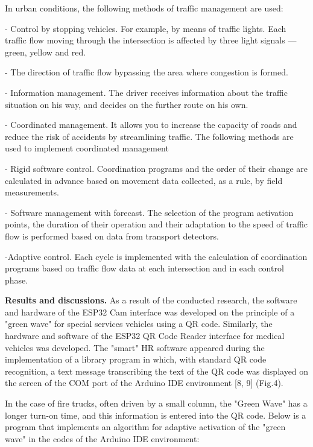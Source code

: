 \begin{multicols}{2}
In urban conditions, the following methods of traffic management are
used:

- Control by stopping vehicles. For example, by means of traffic lights.
Each traffic flow moving through the intersection is affected by three
light signals --- green, yellow and red.

- The direction of traffic flow bypassing the area where congestion is
formed.

- Information management. The driver receives information about the
traffic situation on his way, and decides on the further route on his
own.

- Coordinated management. It allows you to increase the capacity of
roads and reduce the risk of accidents by streamlining traffic. The
following methods are used to implement coordinated management

- Rigid software control. Coordination programs and the order of their
change are calculated in advance based on movement data collected, as a
rule, by field measurements.

- Software management with forecast. The selection of the program
activation points, the duration of their operation and their adaptation
to the speed of traffic flow is performed based on data from transport
detectors.

-Adaptive control. Each cycle is implemented with the calculation of
coordination programs based on traffic flow data at each intersection
and in each control phase.

{\bfseries Results and discussions.} As a result of the conducted research,
the software and hardware of the ESP32 Cam interface was developed on
the principle of a "green wave" for special services vehicles using a QR
code. Similarly, the hardware and software of the ESP32 QR Code Reader
interface for medical vehicles was developed. The "smart" HR software
appeared during the implementation of a library program in which, with
standard QR code recognition, a text message transcribing the text of
the QR code was displayed on the screen of the COM port of the Arduino
IDE environment {[}8, 9{]} (Fig.4).


In the case of fire trucks, often driven by a small column, the "Green
Wave" has a longer turn-on time, and this information is entered into
the QR code. Below is a program that implements an algorithm for
adaptive activation of the "green wave" in the codes of the Arduino IDE
environment:
\end{multicols}

